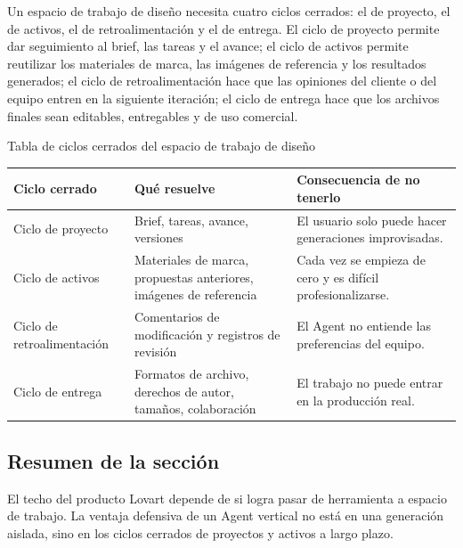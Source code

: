 Un espacio de trabajo de diseño necesita cuatro ciclos cerrados: el de proyecto, el de activos, el de retroalimentación y el de entrega. El ciclo de proyecto permite dar seguimiento al brief, las tareas y el avance; el ciclo de activos permite reutilizar los materiales de marca, las imágenes de referencia y los resultados generados; el ciclo de retroalimentación hace que las opiniones del cliente o del equipo entren en la siguiente iteración; el ciclo de entrega hace que los archivos finales sean editables, entregables y de uso comercial.

\begin{knowledgebox}{Tabla de ciclos cerrados del espacio de trabajo de diseño}
\begin{tabularx}{\textwidth}{p{}p{}X}
\toprule
Ciclo cerrado & Qué resuelve & Consecuencia de no tenerlo \\
\midrule
Ciclo de proyecto & Brief, tareas, avance, versiones & El usuario solo puede hacer generaciones improvisadas. \\
Ciclo de activos & Materiales de marca, propuestas anteriores, imágenes de referencia & Cada vez se empieza de cero y es difícil profesionalizarse. \\
Ciclo de retroalimentación & Comentarios de modificación y registros de revisión & El Agent no entiende las preferencias del equipo. \\
Ciclo de entrega & Formatos de archivo, derechos de autor, tamaños, colaboración & El trabajo no puede entrar en la producción real. \\
\bottomrule
\end{tabularx}
\end{knowledgebox}

\subsection{Resumen de la sección}

El techo del producto Lovart depende de si logra pasar de herramienta a espacio de trabajo. La ventaja defensiva de un Agent vertical no está en una generación aislada, sino en los ciclos cerrados de proyectos y activos a largo plazo.
